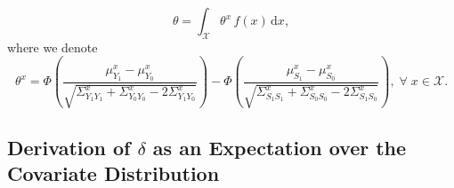 \documentclass[referee,usenatbib]{biom}
\begin{document}
\begin{equation*}
    \theta = \int_{\mathcal{X}} \theta^{x} \, f(x) \, \text{d}x,
\end{equation*}
where we denote
\begin{equation*}
    \theta^{x} = %
    \Phi \left( \frac{ \mu^{x}_{Y_{1}} - \mu^{x}_{Y_{0}}}{\sqrt{\Sigma^{x}_{Y_{1} Y_{1}} + \Sigma^{x}_{Y_{0} Y_{0}} - 2 \Sigma^{x}_{Y_{1} Y_{0}}}} \right) - \Phi \left( \frac{ \mu^{x}_{S_{1}} - \mu^{x}_{S_{0}}}{\sqrt{\Sigma^{x}_{S_{1} S_{1}} + \Sigma^{x}_{S_{0} S_{0}} - 2 \Sigma^{x}_{S_{1} S_{0}}}} \right), \; \forall \; x \in \mathcal{X}.
\end{equation*}


\subsection{Derivation of \texorpdfstring{\(\delta\)}{delta} as an Expectation over the Covariate Distribution}
\label{app:derivation_delta}
\end{document}
